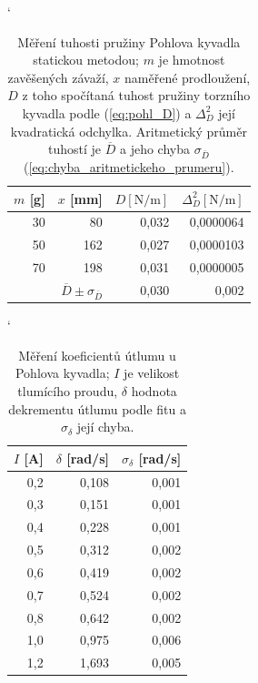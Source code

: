 \documentclass[english]{article}
\newcommand{\unit}[1]{\mathrm{#1}}
\begin{document}
\begin{table}[htbp]
   			\catcode` %
 			  \centering
			    \begin{tabular}{|r|r|r|r|}
			    \hline
			   $m$ [g] & $x$ [mm] & $D \unit{[N/m]}$ & $\Delta_D^2 \unit{[N/m]}$ \\ \hline \hline
			   30    & 80    & 0,032 & 0,0000064 \\ \hline
			   50    & 162   & 0,027 & 0,0000103 \\ \hline
			   70    & 198   & 0,031 & 0,0000005 \\ \hline
			    \multicolumn{1}{r|}{}      & $\overline{D} \pm \sigma_{\overline{D}}$ & 0,030 & 0,002 \\ \cline{2-4}
			    \end{tabular}%
 			  \caption{Měření tuhosti pružiny Pohlova kyvadla statickou metodou; $m$ je hmotnost zavěšených závaží, $x$ naměřené prodloužení, $D$ z toho spočítaná tuhost pružiny torzního kyvadla podle (\ref{eq:pohl_D}) a $\Delta_D^2$ její kvadratická odchylka. Aritmetický průměr tuhostí je $\overline{D}$ a jeho chyba $\sigma_{\overline{D}}$ (\ref{eq:chyba_aritmetickeho_prumeru}). }
 			  \label{tab:pohl_tuhost}%
   		\end{table}%

\begin{table}[htbp]
		\catcode` %
		  \centering
		    \begin{tabular}{|r|r|r|}
		    \hline
		    $I$ [A] & $\delta$ [rad/s] & $\sigma_\delta$ [rad/s] \\ \hline\hline
		    0,2   & 0,108 & 0,001 \\\hline
		    0,3   & 0,151 & 0,001 \\\hline
		    0,4   & 0,228 & 0,001 \\\hline
		    0,5   & 0,312 & 0,002 \\\hline
		    0,6   & 0,419 & 0,002 \\\hline
		    0,7   & 0,524 & 0,002 \\\hline
		    0,8   & 0,642 & 0,002 \\\hline
		    1,0   & 0,975 & 0,006 \\\hline
		    1,2   & 1,693 & 0,005 \\\hline
		    \end{tabular}%
		  \caption{Měření koeficientů útlumu u Pohlova kyvadla; $I$ je velikost tlumícího proudu, $\delta$ hodnota dekrementu útlumu podle fitu a $\sigma_\delta$ její chyba.}
		  \label{tab:pohl_dekrementy}%
		\end{table}%
\end{document}
